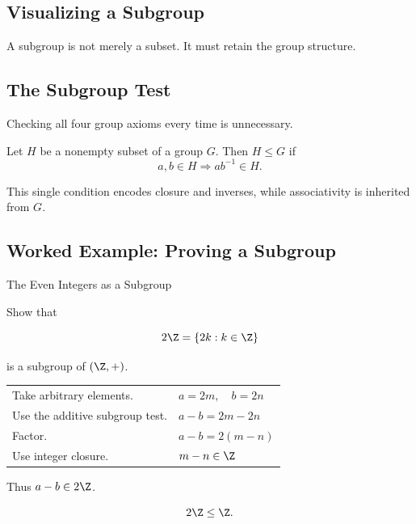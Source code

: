 \subsection{Visualizing a Subgroup}
\label{subsec:visual-subgroup}

\begin{center}
\end{center}

A subgroup is not merely a subset. It must retain the group structure.

\subsection{The Subgroup Test}
\label{subsec:subgroup-test}

Checking all four group axioms every time is unnecessary.

\begin{theorem}
Let \(H\) be a nonempty subset of a group \(G\). Then \(H\leq G\) if
\[ a,b\in H\Longrightarrow ab^{-1}\in H. \]
\end{theorem}

This single condition encodes closure and inverses, while associativity is
inherited from \(G\).

\subsection{Worked Example: Proving a Subgroup}
\label{subsec:worked-subgroup}

\begin{workedexamplebox}{The Even Integers as a Subgroup}

Show that

\[ 2\Z=\{2k:k\in\Z\} \]

is a subgroup of \((\Z,+)\).

\begin{tabularx}{\textwidth}{@{}>{\raggedright\arraybackslash}p{}X@{}}
Take arbitrary elements. & \(a=2m,\quad b=2n\)\\
Use the additive subgroup test. & \(a-b=2m-2n\)\\
Factor. & \(a-b=2(m-n)\)\\
Use integer closure. & \(m-n\in\Z\)
\end{tabularx}

Thus \(a-b\in2\Z\).

\begin{answerbox}
\[ 2\Z\leq\Z. \]
\end{answerbox}
\end{workedexamplebox}

